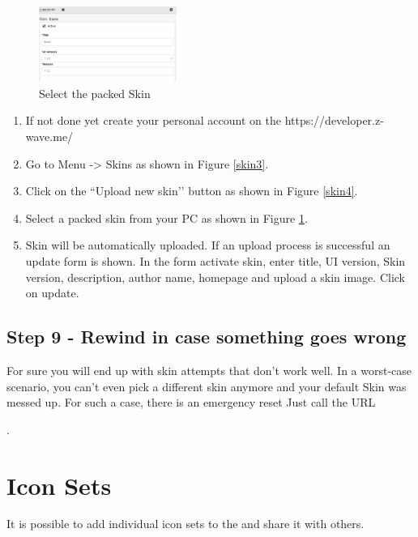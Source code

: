 \begin{figure}
\begin{center}
\includegraphics[width=0.4\textwidth]{pngs/cap10/skin5.png}
\caption{Select the packed Skin}
\label{skin5}
\end{center}
\end{figure}


\begin{enumerate}
\item If not done yet create your personal account on the https://developer.z-wave.me/
\item Go to Menu -> Skins as shown in Figure \ref{skin3}.
\item Click on the ``Upload new skin’’ button as shown in Figure \ref{skin4}.
\item Select a packed skin from your PC as shown in Figure \ref{skin5}.
\item Skin will be automatically uploaded. If an upload process is successful an update 
form is shown. In the form activate skin, enter title, UI version, Skin version, 
description, author name, homepage and upload a skin image. Click on update.
\end{enumerate}


\subsection{Step 9 - Rewind in case something goes wrong}

For sure you will end up with skin attempts that don't work well. In a worst-case scenario, 
you can't even pick a different skin anymore and your default Skin was messed up. For 
such a case, there is an emergency reset Just call the URL


.



\section{Icon Sets}

It is possible to add individual icon sets to the \zway and share it with others.


